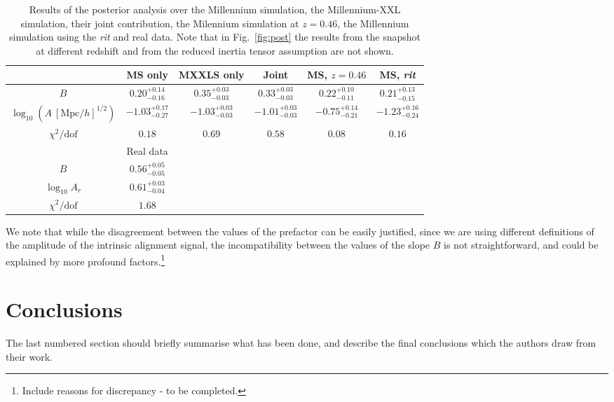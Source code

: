 \documentclass[a4paper,fleqn,usenatbib]{mnras}
\begin{document}
\begin{table*}
	\centering
	\caption{Results of the posterior analysis over the Millennium simulation, the Millennium-XXL simulation, their joint contribution, the Milennium simulation at $z = 0.46$, the Millennium simulation using the \textit{rit} and real data. Note that in Fig.~\ref{fig:post}\protect{} the results from the snapshot at different redshift and from the reduced inertia tensor assumption are not shown.}
	\label{tab:param}
	\begin{tabular}{c||ccccc} %
		\hline \hline
		\ & MS only & MXXLS only & Joint & MS, $z=0.46$ & MS, \textit{rit} \\
		\hline
		$B$					  & $0.20^{+0.14}_{-0.16}$   & $0.35^{+0.03}_{-0.03}$  & $0.33^{+0.03}_{-0.03}$ &  $0.22^{+0.10}_{-0.11}$ & $0.21^{+0.13}_{-0.15}$ \\
		$\log_{10} (A \ [\mbox{Mpc}/h]^{1/2})$ & $-1.03^{+0.17}_{-0.27}$ & $-1.03^{+0.03}_{-0.03}$ & $-1.01^{+0.03}_{-0.03}$&$-0.75^{+0.14}_{-0.21}$&  $-1.23^{+0.16}_{-0.24}$\\
		$\chi^2 / \mbox{dof}$			  & $0.18$                                 & $0.69$			 & $0.58$			    & $0.08$			      & $0.16$	 \\
		\hline \hline
		\ & Real data & \ & \ \\
		\hline
		$B$ & $0.56^{+0.05}_{-0.05}$ & &\\
		$\log_{10} A_r $ & $0.61^{+0.03}_{-0.04}$ & & & & \\
		$\chi^2 / \mbox{dof}$			  & $1.68$  & & & & \\
		\hline \hline 
		\end{tabular}
\end{table*}

We note that while the disagreement between the values of the prefactor can be easily justified, since we are using different definitions of the amplitude of the intrinsic alignment signal, the incompatibility between the values of the slope $B$ is not straightforward, and could be explained by more profound factors.\footnote{Include reasons for discrepancy - to be completed.}

\section{Conclusions}

The last numbered section should briefly summarise what has been done, and describe
the final conclusions which the authors draw from their work.
\end{document}
